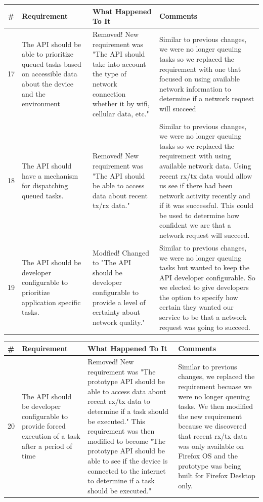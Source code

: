 \documentclass[12pt]{article}
\begin{document}
\begin{tabularx}{\textwidth}{|p{1cm}|X|X|X|}
\hline
\#  & Requirement 				& What Happened To It 		  & Comments \\ \hline
17 & The API should be able to prioritize queued tasks based on accessible data about the device and the environment & Removed! New requirement was "The API should take into account the type of network connection whether it by wifi, cellular data, etc." & Similar to previous changes, we were no longer queuing tasks so we replaced the requirement with one that focused on using available network information to determine if a network request will succeed \\ \hline
18 & The API should have a mechanism for dispatching queued tasks. & Removed! New requirement was "The API should be able to access data about recent tx/rx data." & Similar to previous changes, we were no longer queuing tasks so we replaced the requirement with using available network data.  Using recent rx/tx data would allow us see if there had been network activity recently and if it was successful. This could be used to determine how confident we are that a network request will succeed. \\ \hline
19 & The API should be developer configurable to prioritize application specific tasks. & Modfied! Changed to "The API should be developer configurable to provide a level of certainty about network quality." & Similar to previous changes, we were no longer queuing tasks but wanted to keep the API developer configurable.  So we elected to give developers the option to specify how certain they wanted our service to be that a network request was going to succeed. \\ \hline
\end{tabularx}
\pagebreak

\begin{tabularx}{\textwidth}{|p{1cm}|X|X|X|}
\hline
\#  & Requirement 				& What Happened To It 		  & Comments \\ \hline
20 & The API should be developer configurable to provide forced execution of a task after a period of time & Removed! New requirement was "The prototype API should be able to access data about recent rx/tx data to determine if a task should be executed." This requirement was then modified to become "The prototype API should be able to see if the device is connected to the internet to determine if a task should be executed." & Similar to previous changes, we replaced the requirement becuase we were no longer queuing tasks.  We then modified the new requirement because we discovered that recent rx/tx data was only available on Firefox OS and the prototype was being built for Firefox Desktop only.  \\ \hline
\end{tabularx}
\pagebreak
\end{document}
